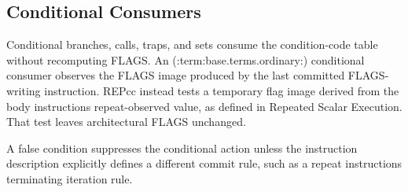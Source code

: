 \subsection{Conditional Consumers}
Conditional branches, calls, traps, and sets consume the condition-code table without recomputing FLAGS. An (:term:base.terms.ordinary:)
conditional consumer observes the FLAGS image produced by the last committed FLAGS-writing instruction. REPcc instead
tests a temporary flag image derived from the body instruction\textquotesingle{}s repeat-observed value, as defined in Repeated Scalar
Execution. That test leaves architectural FLAGS unchanged.

A false condition suppresses the conditional action unless the instruction description explicitly defines a different
commit rule, such as a repeat instruction\textquotesingle{}s terminating iteration rule.
